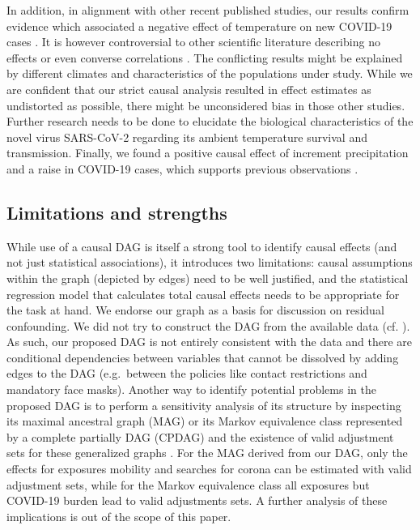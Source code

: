 \documentclass[]{elsarticle} %
\begin{document}
In addition, in alignment with other recent published studies, our
results confirm evidence which associated a negative effect of
temperature on new COVID-19 cases
\citep{bannister-tyrrell_preliminary_2020, demongeot_temperature_2020, liu_impact_2020, qi_covid-19_2020, shi_impact_2020, sobral_association_2020, tosepu_correlation_2020, Wang2020temperature, wu_effects_2020}.
It is however controversial to other scientific literature describing no
effects
\citep{briz-redon_spatio-temporal_2020, iqbal_nexus_2020, jahangiri_sensitivity_2020, juni_impact_2020, yao_no_2020}
or even converse correlations
\citep{auler_evidence_2020, xie_association_2020}. The conflicting
results might be explained by different climates and characteristics of
the populations under study. While we are confident that our strict
causal analysis resulted in effect estimates as undistorted as possible,
there might be unconsidered bias in those other studies. Further
research needs to be done to elucidate the biological characteristics of
the novel virus SARS-CoV-2 regarding its ambient temperature survival
and transmission. Finally, we found a positive causal effect of
increment precipitation and a raise in COVID-19 cases, which supports
previous observations \citep{sobral_association_2020}.

\subsection{Limitations and strengths}\label{limitations-and-strengths}

While use of a causal DAG is itself a strong tool to identify causal
effects (and not just statistical associations), it introduces two
limitations: causal assumptions within the graph (depicted by edges)
need to be well justified, and the statistical regression model that
calculates total causal effects needs to be appropriate for the task at
hand. We endorse our graph as a basis for discussion on residual
confounding. We did not try to construct the DAG from the available data
(cf. \citep{gencoglu2020causal}). As such, our proposed DAG is not
entirely consistent with the data and there are conditional dependencies
between variables that cannot be dissolved by adding edges to the DAG
(e.g.~between the policies like contact restrictions and mandatory face
masks). Another way to identify potential problems in the proposed DAG
is to perform a sensitivity analysis of its structure by inspecting its
maximal ancestral graph (MAG) or its Markov equivalence class
represented by a complete partially DAG (CPDAG) and the existence of
valid adjustment sets for these generalized graphs
\citep{perkovic2017complete}. For the MAG derived from our DAG, only the
effects for exposures mobility and searches for corona can be estimated
with valid adjustment sets, while for the Markov equivalence class all
exposures but COVID-19 burden lead to valid adjustments sets. A further
analysis of these implications is out of the scope of this paper.
\end{document}
